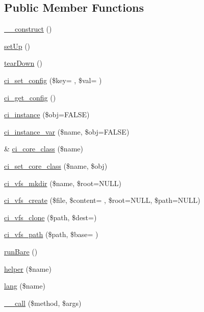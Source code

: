 \subsection*{Public Member Functions}
\begin{DoxyCompactItemize}
\item 
\hyperlink{class_c_i___test_case_a095c5d389db211932136b53f25f39685}{\+\_\+\+\_\+construct} ()
\item 
\hyperlink{class_c_i___test_case_a0bc688732d2b3b162ffebaf7812e78da}{set\+Up} ()
\item 
\hyperlink{class_c_i___test_case_a80fe3d17e658907fc75346a0ec9d6fc7}{tear\+Down} ()
\item 
\hyperlink{class_c_i___test_case_afbfdcd464fbfa70f143c658ec126bab5}{ci\+\_\+set\+\_\+config} (\$key= \textquotesingle{}\textquotesingle{}, \$val= \textquotesingle{}\textquotesingle{})
\item 
\hyperlink{class_c_i___test_case_a8645635171b9f294f9df77529fd8f3ea}{ci\+\_\+get\+\_\+config} ()
\item 
\hyperlink{class_c_i___test_case_aa8b4a3e00d5de522ee70f4ea781b3b5c}{ci\+\_\+instance} (\$obj=F\+A\+L\+S\+E)
\item 
\hyperlink{class_c_i___test_case_a149cfa8471db2eeb9a5eb19a0b34d672}{ci\+\_\+instance\+\_\+var} (\$name, \$obj=F\+A\+L\+S\+E)
\item 
\& \hyperlink{class_c_i___test_case_abdf0c039b7f0c346ec2579b7fbe8d877}{ci\+\_\+core\+\_\+class} (\$name)
\item 
\hyperlink{class_c_i___test_case_a0fc8966cee7dacebf1cdd2cfce007e06}{ci\+\_\+set\+\_\+core\+\_\+class} (\$name, \$obj)
\item 
\hyperlink{class_c_i___test_case_a1d0c19b9a97d64c02d2e1acb7faf6a46}{ci\+\_\+vfs\+\_\+mkdir} (\$name, \$root=N\+U\+L\+L)
\item 
\hyperlink{class_c_i___test_case_ae8414da1ed9ea0f210c9f16149e2ffcc}{ci\+\_\+vfs\+\_\+create} (\$file, \$content= \textquotesingle{}\textquotesingle{}, \$root=N\+U\+L\+L, \$path=N\+U\+L\+L)
\item 
\hyperlink{class_c_i___test_case_abffd8d97ca5b3fd033a606ea1c966d38}{ci\+\_\+vfs\+\_\+clone} (\$path, \$dest=\textquotesingle{}\textquotesingle{})
\item 
\hyperlink{class_c_i___test_case_a1c15a41a8cad75703b43277764968d8b}{ci\+\_\+vfs\+\_\+path} (\$path, \$base= \textquotesingle{}\textquotesingle{})
\item 
\hyperlink{class_c_i___test_case_a3473c953293b878519f7e2441c6ae4ef}{run\+Bare} ()
\item 
\hyperlink{class_c_i___test_case_aca7feaa7ae54e8df01f7e3e5778dccd3}{helper} (\$name)
\item 
\hyperlink{class_c_i___test_case_ac4b07a9661fea3913765e09a825381a9}{lang} (\$name)
\item 
\hyperlink{class_c_i___test_case_a9f1179240d068c94a040021326032bed}{\+\_\+\+\_\+call} (\$method, \$args)
\end{DoxyCompactItemize}
